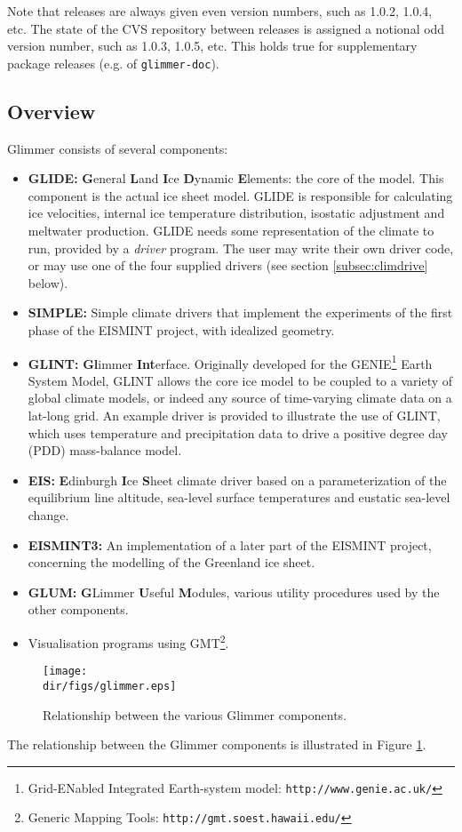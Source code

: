 Note that releases are always given even version numbers, such as 1.0.2, 1.0.4,
etc. The state of the CVS repository between releases is assigned a notional
odd version number, such as 1.0.3, 1.0.5, etc. This holds true for
supplementary package releases (e.g. of \texttt{glimmer-doc}).
%
\subsection{Overview}
%
Glimmer consists of several components:
%
\begin{itemize}
\item {\bf GLIDE:} {\bf G}eneral {\bf L}and {\bf I}ce {\bf D}ynamic
  {\bf E}lements: the core of the model.  This component is the actual
  ice sheet model. GLIDE is responsible for calculating ice
  velocities, internal ice temperature distribution, isostatic
  adjustment and meltwater production. GLIDE needs some representation
  of the climate to run, provided by a {\it driver} program. The user
  may write their own driver code, or may use one of the four supplied
  drivers (see section \ref{subsec:climdrive} below). 
\item {\bf SIMPLE:} Simple climate drivers that implement the
  experiments of the first phase of the EISMINT project, with
  idealized geometry. 
\item {\bf GLINT:} {\bf Gl}immer {\bf Int}erface. Originally developed
  for the GENIE\footnote{Grid-ENabled Integrated Earth-system model:
  \texttt{http://www.genie.ac.uk/}} Earth System Model, GLINT allows
  the core ice model to be coupled to a variety of global climate
  models, or indeed any source of time-varying climate data on a
  lat-long grid. An example driver is provided to illustrate the use
  of GLINT, which uses temperature and precipitation data to drive a
  positive degree day (PDD) mass-balance model. 
\item {\bf EIS:} {\bf E}dinburgh {\bf I}ce {\bf S}heet climate driver
  based on a parameterization of the equilibrium line altitude,
  sea-level surface temperatures and eustatic sea-level change. 
\item {\bf EISMINT3:} An implementation of a later part of the EISMINT
  project, concerning the modelling of the Greenland ice sheet. 
\item {\bf GLUM:} {\bf G}Limmer {\bf U}seful {\bf M}odules, various
  utility procedures used by the other components. 
\item Visualisation programs using GMT\footnote{Generic Mapping Tools:
\texttt{http://gmt.soest.hawaii.edu/}}.
\end{itemize}
%
\begin{figure}[htbp]
  \centering
  \texttt{[image: \\dir/figs/glimmer.eps]}
  \caption{Relationship between the various Glimmer components.}
  \label{ug.fig.glimmer}
\end{figure}
The relationship between the Glimmer components is illustrated in Figure \ref{ug.fig.glimmer}.
%
